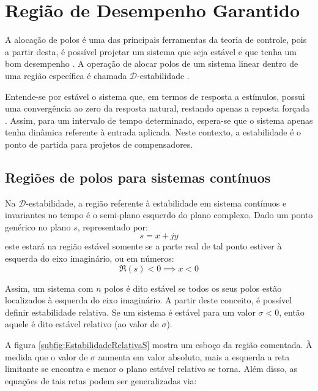\chapter{Região de Desempenho Garantido}

A alocação de polos é uma das principais ferramentas da teoria de controle, pois a partir desta, é possível projetar um sistema que seja estável e que tenha um bom desempenho . A operação de alocar polos de um sistema linear dentro de uma região específica é chamada $\mathscr{D}$-estabilidade .

Entende-se por estável o sistema que, em termos de resposta a estímulos, possui uma convergência ao zero da resposta natural, restando apenas a reposta forçada \cite{NISE2011}. Assim, para um intervalo de tempo determinado, espera-se que o sistema apenas tenha dinâmica referente à entrada aplicada. Neste contexto, a estabilidade é o ponto de partida para projetos de compensadores.

\section{Regiões de polos para sistemas contínuos}\label{sec:DEstabilidadeS}

Na $\mathscr{D}$-estabilidade, a região referente à estabilidade em sistema contínuos e invariantes no tempo é o semi-plano esquerdo do plano complexo. Dado um ponto genérico no plano $s$, representado por:
\begin{equation}
  s = x + jy\label{eq:PontoGenericoPlanoS}
\end{equation}
este estará na região estável somente se a parte real de tal ponto estiver à esquerda do eixo imaginário, ou em números:
\begin{equation}
  \Re{(s)} < 0 \implies x < 0 \label{eq:Estabilidade}
\end{equation}

Assim, um sistema com $n$ polos é dito estável se todos os seus polos estão localizados à esquerda do eixo imaginário. A partir deste conceito, é possível definir estabilidade relativa. Se um sistema é estável para um valor $\sigma < 0$, então aquele é dito estável relativo (ao valor de $\sigma$).

A figura \ref{subfig:EstabilidadeRelativaS} mostra um esboço da região comentada. À medida que o valor de $\sigma$ aumenta em valor absoluto, mais a esquerda a reta limitante se encontra e menor o plano estável relativo se torna. Além disso, as equações de tais retas podem ser generalizadas via:


